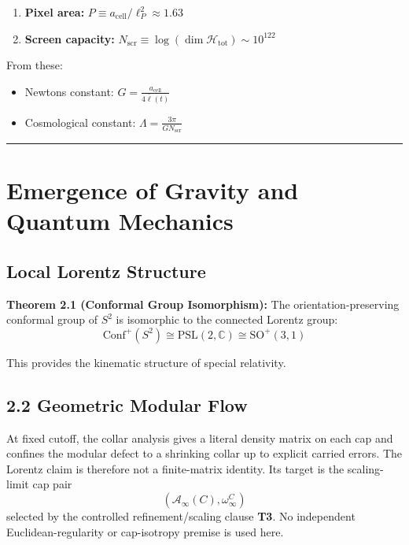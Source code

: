 \begin{enumerate}
\def\labelenumi{\arabic{enumi}.}
\tightlist
\item
 \textbf{Pixel area:} \(P \equiv a_{\text{cell}}/\ell_P^2 \approx 1.63\)
\item
 \textbf{Screen capacity:} \(N_{\mathrm{scr}} \equiv \log(\dim \mathcal{H}_{\text{tot}}) \sim 10^{122}\)
\end{enumerate}

From these:

\begin{itemize}
\tightlist
\item
 Newton\textquotesingle s constant: \(G = \frac{a_{\text{cell}}}{4\bar{\ell}(t)}\)
\item
 Cosmological constant: \(\Lambda = \frac{3\pi}{G N_{\mathrm{scr}}}\)
\end{itemize}

\begin{center}\rule{0.5\linewidth}{0.5pt}\end{center}

\section{Emergence of Gravity and Quantum Mechanics}\label{2-emergence-of-gravity-and-quantum-mechanics}

\subsection{Local Lorentz Structure}\label{21-local-lorentz-structure}

\textbf{Theorem 2.1 (Conformal Group Isomorphism):} The orientation-preserving conformal group of \(S^2\) is isomorphic to the connected Lorentz group: \[\text{Conf}^+(S^2) \cong \text{PSL}(2,\mathbb{C}) \cong \text{SO}^+(3,1)\]

This provides the kinematic structure of special relativity.

\subsection{2.2 Geometric Modular Flow}\label{22-geometric-modular-flow}

At fixed cutoff, the collar analysis gives a literal density matrix on each cap and confines the modular defect to a shrinking collar up to explicit carried errors. The Lorentz claim is therefore not a finite-matrix identity. Its target is the scaling-limit cap pair
\[
(\mathcal A_\infty(C),\omega_\infty^C)
\]
selected by the controlled refinement/scaling clause \textbf{T3}. No independent Euclidean-regularity or cap-isotropy premise is used here.

